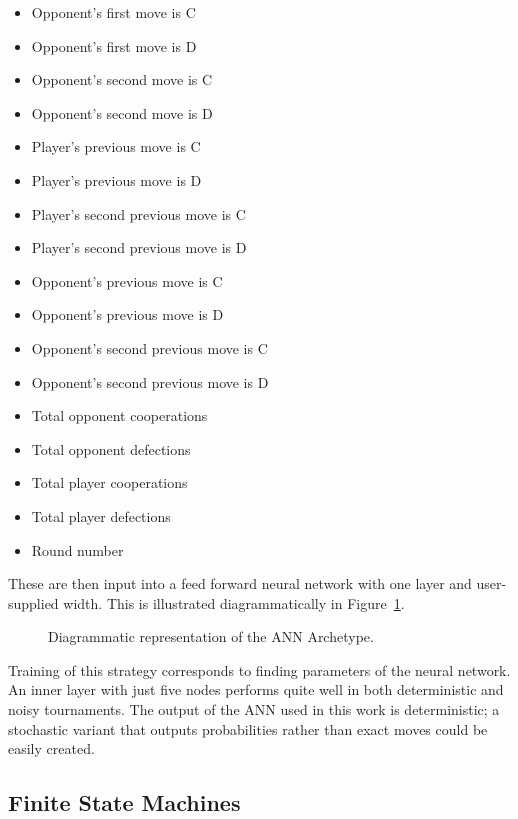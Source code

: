 \documentclass{article}
\begin{document}
\begin{multicols}{2}
    \begin{itemize}
        \item Opponent's first move is C
        \item Opponent's first move is D
        \item Opponent's second move is C
        \item Opponent's second move is D
        \item Player's previous move is C
        \item Player's previous move is D
        \item Player's second previous move is C
        \item Player's second previous move is D
        \item Opponent's previous move is C
        \item Opponent's previous move is D
        \item Opponent's second previous move is C
        \item Opponent's second previous move is D
        \item Total opponent cooperations
        \item Total opponent defections
        \item Total player cooperations
        \item Total player defections
        \item Round number
    \end{itemize}
\end{multicols}

These are then input into a feed forward neural network with one layer and
user-supplied width.  This is illustrated diagrammatically in
Figure~\ref{fig:ann}.

\begin{figure}[!hbtp]
    \centering
    
    \caption{Diagrammatic representation of the ANN Archetype.}
    \label{fig:ann}
\end{figure}

Training of this strategy corresponds to finding parameters of the neural
network. An inner layer with just five nodes performs quite well in both deterministic and
noisy tournaments. The output of the ANN used in this work is deterministic;
a stochastic variant that outputs probabilities rather than exact moves could
be easily created.

\subsection{Finite State Machines}\label{sec:fsm}
\end{document}
